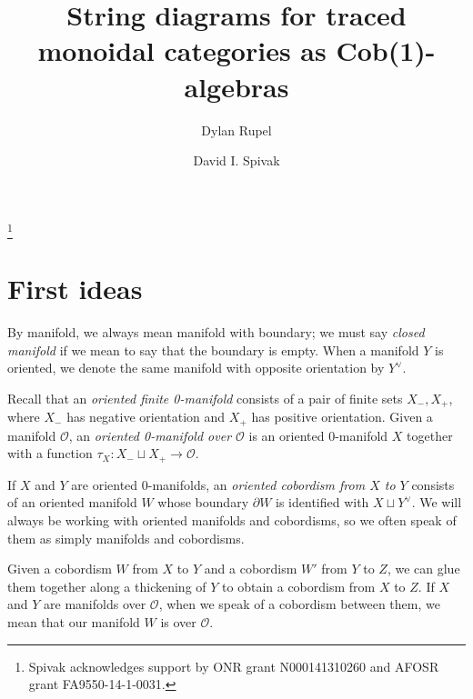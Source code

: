 \documentclass{amsart}
\def\mc{\mathcal}
\def\to{\rightarrow}
\def\taking{\colon}
\def\mcO{\mc{O}}
\newcommand{\inp}[1]{{#1_-}}
\newcommand{\outp}[1]{{#1_+}}
\theoremstyle{remark}
\theoremstyle{definition}
\begin{document}
\title{String diagrams for traced monoidal categories as Cob(1)-algebras}

\author{Dylan Rupel}
\address{Northeastern University\\360 Huntington Ave.\\Boston, MA 02115}

\author{David I. Spivak}
\address{Massachusetts Institute of Technology\\77 Massachusetts Ave.\\Cambridge, MA 02139}

\thanks{Spivak acknowledges support by ONR grant N000141310260 and AFOSR grant FA9550-14-1-0031.}


\maketitle

\tableofcontents

\section{First ideas}

By manifold, we always mean manifold with boundary; we must say {\em closed manifold} if we mean to say that the boundary is empty. When a manifold $Y$ is oriented, we denote the same manifold with opposite orientation by $Y^\vee$.

Recall that an {\em oriented finite 0-manifold} consists of a pair of finite sets $\inp{X},\outp{X}$, where $\inp{X}$ has negative orientation and $\outp{X}$ has positive orientation. Given a manifold $\mcO$, an {\em oriented 0-manifold over $\mcO$} is an oriented $0$-manifold $X$ together with a function $\tau_X\taking\inp{X}\sqcup \outp{X}\to\mcO$. 

If $X$ and $Y$ are oriented $0$-manifolds, an {\em oriented cobordism from $X$ to $Y$} consists of an oriented manifold $W$ whose boundary $\partial W$ is identified with $X\sqcup Y^\vee$. We will always be working with oriented manifolds and cobordisms, so we often speak of them as simply manifolds and cobordisms. 

Given a cobordism $W$ from $X$ to $Y$ and a cobordism $W'$ from $Y$ to $Z$, we can glue them together along a thickening of $Y$ to obtain a cobordism from $X$ to $Z$. If $X$ and $Y$ are manifolds over $\mcO$, when we speak of a cobordism between them, we mean that our manifold $W$ is over $\mcO$.
\end{document}
